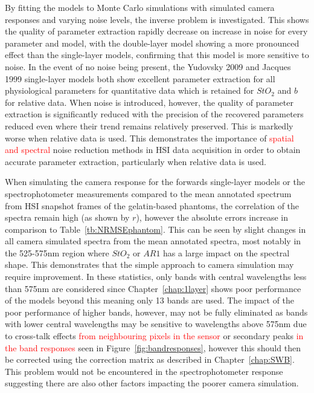 By fitting the models to Monte Carlo simulations with simulated camera responses and varying noise levels, the inverse problem is investigated. This shows the quality of parameter extraction rapidly decrease on increase in noise for every parameter and model, with the double-layer model showing a more pronounced effect than the single-layer models, confirming that this model is more sensitive to noise. In the event of no noise being present, the Yudovsky 2009 and Jacques 1999 single-layer models both show excellent parameter extraction for all physiological parameters for quantitative data which is retained for $StO_2$ and $b$ for relative data. When noise is introduced, however, the quality of parameter extraction is significantly reduced with the precision of the recovered parameters reduced even where their trend remains relatively preserved. This is markedly worse when relative data is used. This demonstrates the importance of \textcolor{red}{spatial and spectral} noise reduction methods in HSI data acquisition in order to obtain accurate parameter extraction, particularly when relative data is used. 

When simulating the camera response for the forwards single-layer models or the spectrophotometer measurements compared to the mean annotated spectrum from HSI snapshot frames of the gelatin-based phantoms, the correlation of the spectra remain high (as shown by $r$), however the absolute errors increase in comparison to Table~\ref{tb:NRMSEphantom}. This can be seen by slight changes in all camera simulated spectra from the mean annotated spectra, most notably in the 525-575nm region where $StO_2$ or $AR1$ has a large impact on the spectral shape. This demonstrates that the simple approach to camera simulation may require improvement. In these statistics, only bands with central wavelengths less than 575nm are considered since Chapter~\ref{chap:1layer} shows poor performance of the models beyond this meaning only 13 bands are used. The impact of the poor performance of higher bands, however, may not be fully eliminated as bands with lower central wavelengths may be sensitive to wavelengths above 575nm due to cross-talk effects \textcolor{red}{from neighbouring pixels in the sensor} or secondary peaks \textcolor{red}{in the band responses} seen in Figure~\ref{fig:bandresponses}, however this should then be corrected using the correction matrix as described in Chapter~\ref{chap:SWB}. This problem would not be encountered in the spectrophotometer response suggesting there are also other factors impacting the poorer camera simulation. 

